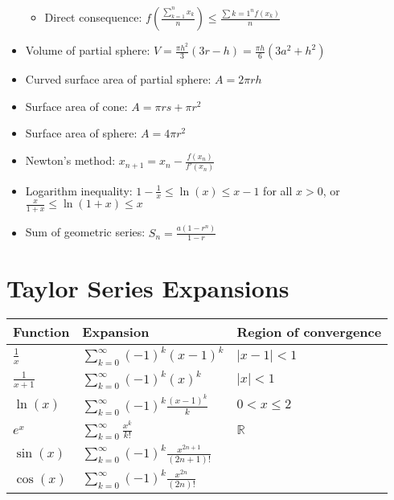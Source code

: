 \documentclass{article}
\begin{document}
\begin{itemize}
	\begin{itemize}
		\item Direct consequence: $f(\frac{\sum_{k=1}^{n} x_k}{n}) \leq \frac{\sum{k=1}^{n} f(x_{k})}{n}$
	\end{itemize}
	\item Volume of partial sphere: $V = \frac{\pi{}h^2}{3}(3r - h) = \frac{\pi{}h}{6}(3a^2 + h^2)$
	\item Curved surface area of partial sphere: $A = 2\pi{}rh$
	\item Surface area of cone: $A = \pi{}rs + \pi{}r^2$
	\item Surface area of sphere: $A = 4\pi{}r^2$
	\item Newton's method: $x_{n + 1} = x_{n} - \frac{f(x_n)}{f'(x_n)}$
	\item Logarithm inequality: $1 - \frac{1}{x} \leq \ln(x) \leq x - 1$ for all $x > 0$, or $\frac{x}{1 + x} \leq \ln(1 + x) \leq x$
	\item Sum of geometric series: $S_n = \frac{a(1 - r^n)}{1 - r}$
\end{itemize}

\section{Taylor Series Expansions}
\begin{table}[h]
	\centering
	\begin{tabularx}{0.75\textwidth}{ X X X }
		Function & Expansion & Region of convergence \\
		\hline
		$\frac{1}{x}$ & $\sum_{k=0}^{\infty} (-1)^{k}(x - 1)^{k}$ & $|x - 1| < 1$ \\
		$\frac{1}{x + 1}$ & $\sum_{k=0}^{\infty} (-1)^{k}(x)^{k}$ & $|x| < 1$ \\
		$\ln(x)$ & $\sum_{k=0}^{\infty}(-1)^{k}\frac{(x - 1)^{k}}{k}$ & $0 < x \leq 2$ \\
		$e^x$ & $\sum_{k=0}^{\infty}\frac{x^k}{k!}$ & $\mathbb{R}$ \\
		$\sin(x)$ & $\sum_{k=0}^{\infty} (-1)^{k}\frac{x^{2n + 1}}{(2n + 1)!}$ & \\
		$\cos(x)$ & $\sum_{k=0}^{\infty} (-1)^{k}\frac{x^{2n}}{(2n)!}$ & \\
	\end{tabularx}
\end{table}
\end{document}
